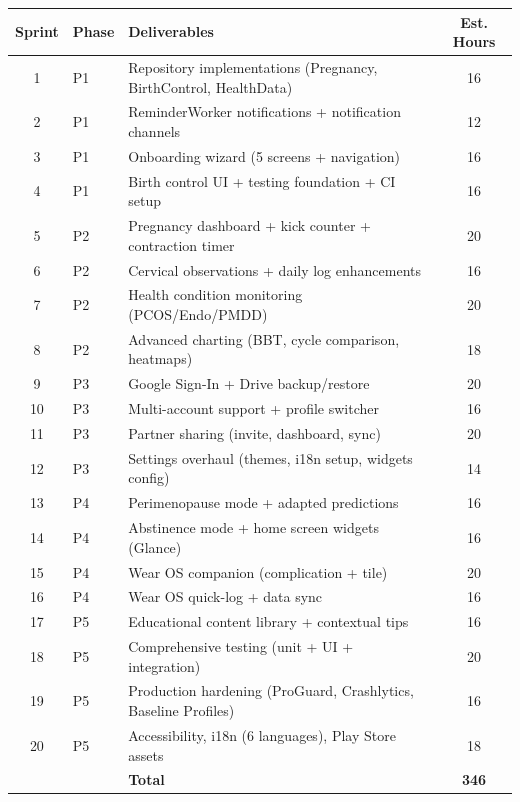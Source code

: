 \documentclass[12pt,a4paper]{article}
\begin{document}
\begin{longtable}{clp{8cm}c}
\toprule
\textbf{Sprint} & \textbf{Phase} & \textbf{Deliverables} & \textbf{Est. Hours} \\
\midrule
\endhead
1 & \textcolor{phase1}{P1} & Repository implementations (Pregnancy, BirthControl, HealthData) & 16 \\
2 & \textcolor{phase1}{P1} & ReminderWorker notifications + notification channels & 12 \\
3 & \textcolor{phase1}{P1} & Onboarding wizard (5 screens + navigation) & 16 \\
4 & \textcolor{phase1}{P1} & Birth control UI + testing foundation + CI setup & 16 \\
\midrule
5 & \textcolor{phase2}{P2} & Pregnancy dashboard + kick counter + contraction timer & 20 \\
6 & \textcolor{phase2}{P2} & Cervical observations + daily log enhancements & 16 \\
7 & \textcolor{phase2}{P2} & Health condition monitoring (PCOS/Endo/PMDD) & 20 \\
8 & \textcolor{phase2}{P2} & Advanced charting (BBT, cycle comparison, heatmaps) & 18 \\
\midrule
9 & \textcolor{phase3}{P3} & Google Sign-In + Drive backup/restore & 20 \\
10 & \textcolor{phase3}{P3} & Multi-account support + profile switcher & 16 \\
11 & \textcolor{phase3}{P3} & Partner sharing (invite, dashboard, sync) & 20 \\
12 & \textcolor{phase3}{P3} & Settings overhaul (themes, i18n setup, widgets config) & 14 \\
\midrule
13 & \textcolor{phase4}{P4} & Perimenopause mode + adapted predictions & 16 \\
14 & \textcolor{phase4}{P4} & Abstinence mode + home screen widgets (Glance) & 16 \\
15 & \textcolor{phase4}{P4} & Wear OS companion (complication + tile) & 20 \\
16 & \textcolor{phase4}{P4} & Wear OS quick-log + data sync & 16 \\
\midrule
17 & \textcolor{phase5}{P5} & Educational content library + contextual tips & 16 \\
18 & \textcolor{phase5}{P5} & Comprehensive testing (unit + UI + integration) & 20 \\
19 & \textcolor{phase5}{P5} & Production hardening (ProGuard, Crashlytics, Baseline Profiles) & 16 \\
20 & \textcolor{phase5}{P5} & Accessibility, i18n (6 languages), Play Store assets & 18 \\
\midrule
& & \textbf{Total} & \textbf{346} \\
\bottomrule
\end{longtable}
\end{document}
